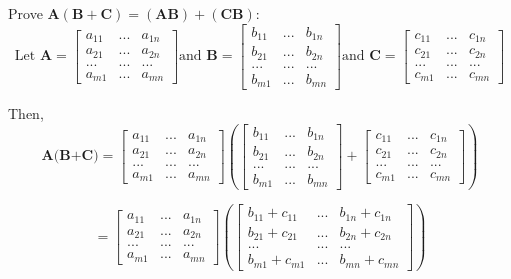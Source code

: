 \documentclass{article}
\begin{document}
\begin{enumerate}
	Prove $ \textbf{A}(\textbf{B} + \textbf{C}) = (\textbf{AB})+(\textbf{CB}) $:
		$$	\text{Let } 
		\textbf{A} = \begin{bmatrix}
		a_{11}  &  ... & a_{1n} \\
		a_{21}  &  ... & a_{2n} \\
		...     &  ... & ...    \\
		a_{m1}  &  ... & a_{mn} 
		\end{bmatrix}  
		\text{and }
		\textbf{B} = \begin{bmatrix}
		b_{11}  &  ... & b_{1n} \\
		b_{21}  &  ... & b_{2n} \\
		...     &  ... & ...    \\
		b_{m1}  &  ... & b_{mn}
		\end{bmatrix}
		\text{and }
		\textbf{C} = \begin{bmatrix}
		c_{11}  &  ... & c_{1n} \\
		c_{21}  &  ... & c_{2n} \\
		...     &  ... & ...    \\
		c_{m1}  &  ... & c_{mn}
		\end{bmatrix}$$
		
		Then, 
		$$\textbf{A(B+C)} = \begin{bmatrix}
		a_{11}  &  ... & a_{1n} \\
		a_{21}  &  ... & a_{2n} \\
		...     &  ... & ...    \\
		a_{m1}  &  ... & a_{mn} 
		\end{bmatrix}
		\left(
		\begin{bmatrix}
		b_{11}  &  ... & b_{1n} \\
		b_{21}  &  ... & b_{2n} \\
		...     &  ... & ...    \\
		b_{m1}  &  ... & b_{mn}
		\end{bmatrix} + \begin{bmatrix}
		c_{11}  &  ... & c_{1n} \\
		c_{21}  &  ... & c_{2n} \\
		...     &  ... & ...    \\
		c_{m1}  &  ... & c_{mn}
		\end{bmatrix}\right)$$
		
		$$= \begin{bmatrix}
		a_{11}  &  ... & a_{1n} \\
		a_{21}  &  ... & a_{2n} \\
		...     &  ... & ...    \\
		a_{m1}  &  ... & a_{mn} 
		\end{bmatrix}
		\left(
		\begin{bmatrix}
		b_{11} + c_{11}  &  ... & b_{1n} + c_{1n} \\
		b_{21} + c_{21}  &  ... & b_{2n} + c_{2n} \\
		...     &  ... & ...    \\
		b_{m1} + c_{m1}  &  ... & b_{mn} + c_{mn}
		\end{bmatrix}\right)$$
		

\end{enumerate}
\end{document}
